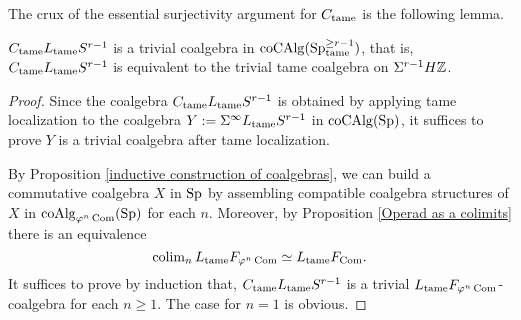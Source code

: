 The crux of the essential surjectivity argument for $C_{\operatorname{\operatorname{tame}}}$ is the following lemma.
\begin{lemma}
	\label{Sigma S^n is a trivial coalgebra}
	$C_{\operatorname{\operatorname{tame}}} L_{\operatorname{\operatorname{tame}}}S^{r-1}$ is a trivial coalgebra in $\operatorname{coCAlg}(\operatorname{Sp}^{\geq r-1}_{\operatorname{\operatorname{tame}}})$, that is, $C_{\operatorname{\operatorname{tame}}} L_{\operatorname{\operatorname{tame}}}S^{r-1}$ is equivalent to the trivial tame coalgebra on $\Sigma^{r-1}H{\mathbb{Z}}$.
\end{lemma}
\begin{proof}
    Since the coalgebra $C_{\operatorname{\operatorname{tame}}} L_{\operatorname{\operatorname{tame}}}S^{r-1}$ is obtained by applying tame localization to the coalgebra
	$Y:=\Sigma^{\infty}L_{\operatorname{\operatorname{tame}}}S^{r-1}$ in $\operatorname{coCAlg}(\operatorname{Sp})$, 
	it suffices to prove $Y$ is a trivial coalgebra after tame localization.
	
	By Proposition \ref{inductive construction of coalgebras}, we can build a commutative coalgebra $X$ in $\operatorname{Sp}$ by assembling compatible coalgebra structures of $X$ in $\operatorname{coAlg}_{\varphi^n \operatorname{Com}}(\operatorname{Sp})$ for each $n$. Moreover, by Proposition \ref{Operad as a colimits} there is an equivalence 
	$$
	\operatorname{colim}_{n} L_{\operatorname{\operatorname{tame}}} F_{\varphi^{n}\operatorname{Com}} \simeq L_{\operatorname{\operatorname{tame}}}F_{\operatorname{Com}}.
	$$ 
	It suffices to prove by induction that, $C_{\operatorname{\operatorname{tame}}}L_{\operatorname{\operatorname{tame}}}S^{r-1}$ is a trivial $L_{\operatorname{\operatorname{tame}}}  F_{\varphi^n\operatorname{Com}}$-coalgebra for each $n\geq 1$. 
	The case for $n=1$ is obvious.
	

\end{proof}
